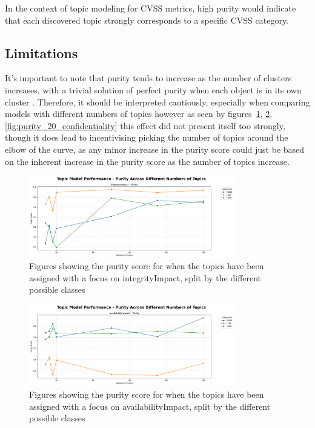 \documentclass[12pt]{article}
\begin{document}
In the context of topic modeling for CVSS metrics, high purity would indicate that each discovered
topic strongly corresponds to a specific CVSS category.

\subsection{Limitations}

It's important to note that purity tends to increase as the number of clusters increases, with a
trivial solution of perfect purity when each object is in its own cluster \cite{v-measure}.
Therefore, it should be interpreted cautiously, especially when comparing models with different
numbers of topics however as seen by figures~\ref{fig:purity_integrity},
\ref{fig:purity_20_availability}, \ref{fig:purity_20_confidentiality} this effect did not present
itself too strongly, though it does lead to incentivising picking the number of topics around the
elbow of the curve, as any minor increase in the purity score could just be based on the inherent
increase in the purity score as the number of topics increase.

\begin{figure}[ht] \centering
	\includegraphics[width=0.8\textwidth]{figures/purity/topic_model_performance_purity_ground_truth_integrityImpact.png}
	\caption{\label{fig:purity_integrity}Figures showing the purity score
		for when the topics have been assigned with a focus on integrityImpact, split by the different
		possible classes}
\end{figure}

\begin{figure}[ht] \centering
	\includegraphics[width=0.8\textwidth]{figures/purity/topic_model_performance_purity_ground_truth_availabilityImpact.png}
	\caption{\label{fig:purity_20_availability}Figures showing the purity score
		for when the topics have been assigned with a focus on availabilityImpact, split by the different
		possible classes}
\end{figure}
\end{document}
